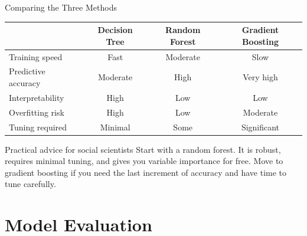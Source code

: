 \documentclass[aspectratio=169, 10pt]{beamer}
\begin{document}
\begin{frame}{Comparing the Three Methods}

\begin{center}
\small
\renewcommand{\arraystretch}{1.4}
\begin{tabular}{lccc}
\toprule
 & \textbf{Decision Tree} & \textbf{Random Forest} & \textbf{Gradient Boosting} \\
\midrule
Training speed     & Fast     & Moderate & Slow \\
Predictive accuracy & Moderate & High     & Very high \\
Interpretability   & High     & Low      & Low \\
Overfitting risk   & High     & Low      & Moderate \\
Tuning required    & Minimal  & Some     & Significant \\
\bottomrule
\end{tabular}
\end{center}

\vspace{1em}
\begin{alertblock}{Practical advice for social scientists}
Start with a random forest. It is robust, requires minimal tuning, and gives you variable importance for free. Move to gradient boosting if you need the last increment of accuracy and have time to tune carefully.
\end{alertblock}
\end{frame}

\section{Model Evaluation}
\end{document}

